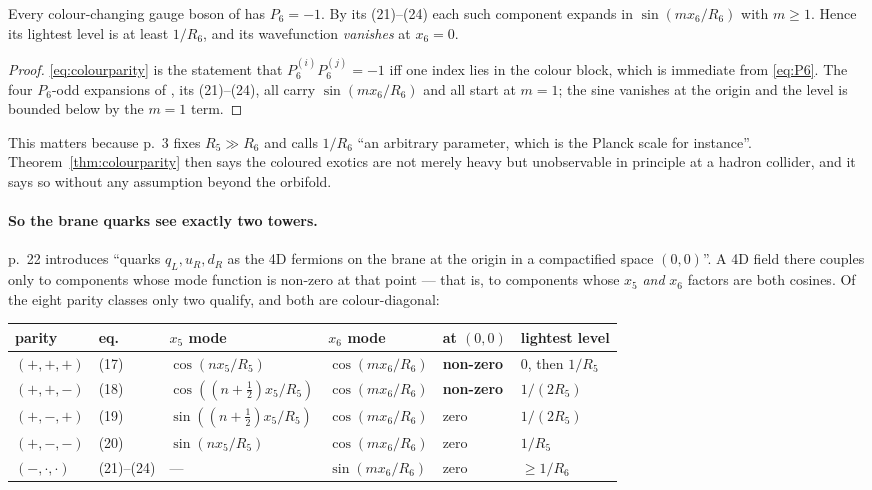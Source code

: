 \begin{theorem}\label{thm:colourparity}
Every colour-changing gauge boson of \cite{KM25} has $P_6=-1$. By its (21)--(24) each such
component expands in $\sin(m x_6/R_6)$ with $m\ge1$. Hence its lightest level is at least $1/R_6$,
and its wavefunction \emph{vanishes} at $x_6=0$.
\end{theorem}
\begin{proof}
\eqref{eq:colourparity} is the statement that $P_6^{(i)}P_6^{(j)}=-1$ iff one index lies in the
colour block, which is immediate from \eqref{eq:P6}. The four $P_6$-odd expansions of \cite{KM25},
its (21)--(24), all carry $\sin(m x_6/R_6)$ and all start at $m=1$; the sine vanishes at the
origin and the level is bounded below by the $m=1$ term.
\end{proof}

\noindent This matters because \cite{KM25} p.~3 fixes $R_5\gg R_6$ and calls $1/R_6$ ``an
arbitrary parameter, which is the Planck scale for instance''. Theorem~\ref{thm:colourparity} then
says the coloured exotics are not merely heavy but unobservable in principle at a hadron collider,
and it says so without any assumption beyond the orbifold.

\paragraph{So the brane quarks see exactly two towers.} \cite{KM25} p.~22 introduces ``quarks
$q_L,u_R,d_R$ as the 4D fermions on the brane at the origin in a compactified space $(0,0)$''. A
4D field there couples only to components whose mode function is non-zero at that point --- that
is, to components whose $x_5$ \emph{and} $x_6$ factors are both cosines. Of the eight parity
classes only two qualify, and both are colour-diagonal:

\begin{center}\small
{}
\begin{tabular}{llllll}
\toprule
\rowcolor{hdrblue!10} parity & eq. & $x_5$ mode & $x_6$ mode & at $(0,0)$ & lightest level\\
\midrule
$(+,+,+)$ & (17) & $\cos(nx_5/R_5)$ & $\cos(mx_6/R_6)$ & \textbf{non-zero} & $0$, then $1/R_5$\\
$(+,+,-)$ & (18) & $\cos((n{+}\tfrac12)x_5/R_5)$ & $\cos(mx_6/R_6)$ & \textbf{non-zero} & $1/(2R_5)$\\
$(+,-,+)$ & (19) & $\sin((n{+}\tfrac12)x_5/R_5)$ & $\cos(mx_6/R_6)$ & zero & $1/(2R_5)$\\
$(+,-,-)$ & (20) & $\sin(nx_5/R_5)$ & $\cos(mx_6/R_6)$ & zero & $1/R_5$\\
$(-,\cdot,\cdot)$ & (21)--(24) & --- & $\sin(mx_6/R_6)$ & zero & $\ge 1/R_6$\\
\bottomrule
\end{tabular}
\end{center}

